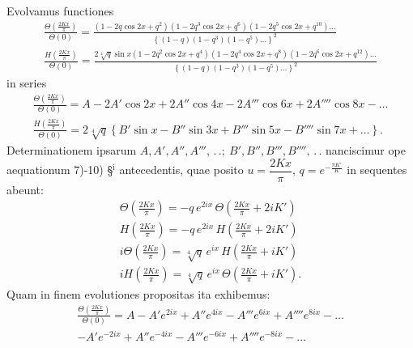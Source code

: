 \documentclass{article}
\begin{document}
Evolvamus functiones
\[
\begin{gathered}
\frac{\Theta\left(\frac{2Kx}{\pi}\right)}{\Theta(0)}=\frac{(1-2q\cos 2x+q^{2})(1-2q^{3}\cos 2x+q^{6})(1-2q^{5}\cos 2x+q^{10})\ldots}{\left\{(1-q)(1-q^{3})(1-q^{5})\ldots\right\}^{2}}\\[2ex]
\frac{H\left(\frac{2Kx}{\pi}\right)}{\Theta(0)}=\frac{2\sqrt[4]{q}\sin x(1-2q^{2}\cos 2x+q^{4})(1-2q^{4}\cos 2x+q^{8})(1-2q^{6}\cos 2x+q^{12})\ldots}{\left\{(1-q)(1-q^{3})(1-q^{5})\ldots\right\}^{2}}
\end{gathered}
\]
in series
\[
\begin{gathered}
\frac{\Theta\left(\frac{2Kx}{\pi}\right)}{\Theta(0)}=A-2A'\cos 2x+2A''\cos 4x-2A'''\cos 6x+2A''''\cos 8x-\ldots\\[2ex]
\frac{H\left(\frac{2Kx}{\pi}\right)}{\Theta(0)}=2\sqrt[4]{q}\left\{B'\sin x-B''\sin 3x+B'''\sin 5x-B''''\sin 7x+\ldots\right\}.
\end{gathered}
\]
Determinationem ipsarum $A,A',A'',A''',\,.\,.;\ B',B'',B''',B'''',\,.\,.$ nanciscimur ope aequationum 7)-10) §$^{\mathrm{i}}$ antecedentis, quae posito $u=\dfrac{2Kx}{\pi}$, $q=e^{-\frac{\pi K'}{K}}$ in sequentes abeunt:
\[
\begin{gathered}
\Theta\left(\frac{2Kx}{\pi}\right)=-q\,e^{2ix}\,\Theta\left(\frac{2Kx}{\pi}+2iK'\right)\\[2ex]
H\left(\frac{2Kx}{\pi}\right)=-q\,e^{2ix}\,H\left(\frac{2Kx}{\pi}+2iK'\right)\\[2ex]
i\Theta\left(\frac{2Kx}{\pi}\right)=\sqrt[4]{q}\,e^{ix}\,H\left(\frac{2Kx}{\pi}+iK'\right)\\[2ex]
iH\left(\frac{2Kx}{\pi}\right)=\sqrt[4]{q}\,e^{ix}\,\Theta\left(\frac{2Kx}{\pi}+iK'\right).
\end{gathered}
\]
Quam in finem evolutiones propositas ita exhibemus:
\[
\begin{gathered}
\frac{\Theta\left(\frac{2Kx}{\pi}\right)}{\Theta(0)}=A-A'e^{2ix}+A''e^{4ix}-A'''e^{6ix}+A''''e^{8ix}-\ldots\\[1.5ex]
-A'e^{-2ix}+A''e^{-4ix}-A'''e^{-6ix}+A''''e^{-8ix}-\ldots
\end{gathered}
\]
\end{document}
